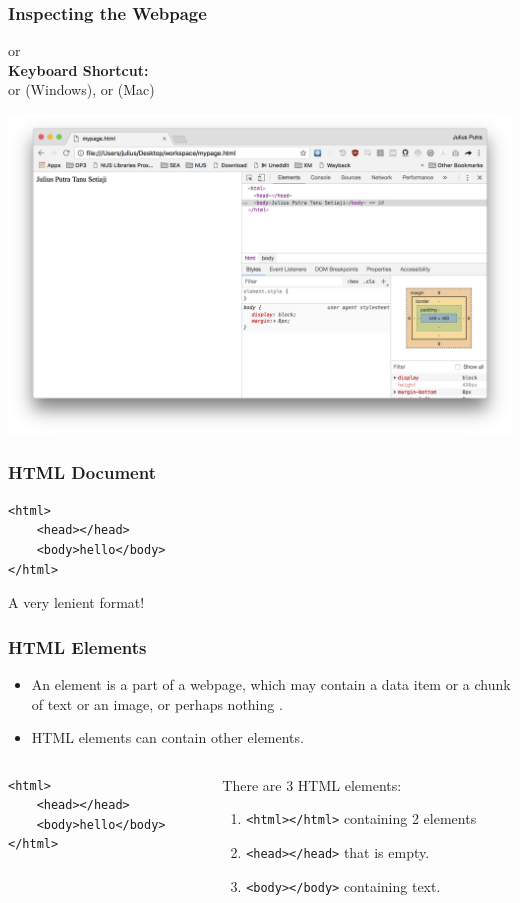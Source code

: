 \documentclass[12pt]{beamer}
\begin{document}
\begin{frame}
\frametitle{Inspecting the Webpage}
 or \\
\textbf{Keyboard Shortcut:}\\
 or  (Windows), or  (Mac)
\begin{center}
	\includegraphics[width=0.75\linewidth]{devtools}
\end{center}
\end{frame}

\begin{frame}[fragile]
\frametitle{HTML Document}
\begin{verbatim}
<html>
	<head></head>
	<body>hello</body>
</html>
\end{verbatim}
A very lenient format!
\end{frame}

\begin{frame}[fragile]
\frametitle{HTML Elements}
\begin{itemize}
	\item An element is a part of a webpage, which may contain a data item or a chunk of text or an image, or perhaps nothing \footnotemark.
	\item HTML elements can contain other elements.
\end{itemize}
\vspace{0.3cm}
\begin{columns}
	\begin{column}{0.3\linewidth}
		\begin{verbatim}
<html>
	<head></head>
	<body>hello</body>
</html>
		\end{verbatim}
	\end{column}
	\begin{column}{0.7\linewidth}
		There are 3 HTML elements:
		\begin{enumerate}
			\item \texttt{<html></html>} containing 2 elements
			\item \texttt{<head></head>} that is empty.
			\item \texttt{<body></body>} containing text.
		\end{enumerate}
	\end{column}
\end{columns}

\end{frame}
\end{document}
